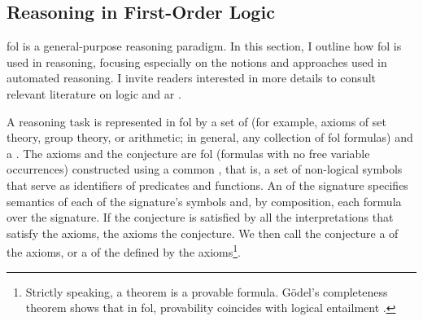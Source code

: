 \subsection{Reasoning in First-Order Logic}


\Gls{fol} is a general-purpose reasoning paradigm.
In this section, I outline how \gls{fol} is used in reasoning,
focusing especially on the notions and approaches used in automated reasoning.
I invite readers interested in more details to consult relevant literature on \gls{logic} \cite{DBLP:books/daglib/0072413,DBLP:books/daglib/0082098} and \gls{ar} \cite{DBLP:books/daglib/0022394,DBLP:books/el/RobinsonV01}.

A reasoning task is represented in \gls{fol} by a set of  (for example, axioms of set theory, group theory, or arithmetic; in general, any collection of \gls{fol} formulas) and a .
The axioms and the conjecture are \gls{fol}  (formulas with no free variable occurrences) constructed using a common , that is, a set of non-logical symbols that serve as identifiers of predicates and functions.
An  of the signature specifies semantics of each of the signature's symbols and, by composition, each formula over the signature.
If the conjecture is satisfied by all the interpretations that satisfy the axioms,
the axioms  the conjecture.
We then call the conjecture
a  of the axioms,
or a  of the  defined by the axioms\footnote{Strictly speaking, a theorem is a provable formula.
Gödel's completeness theorem shows that in \gls{fol},
provability coincides with logical entailment \cite{DBLP:books/daglib/0072413}.}.

